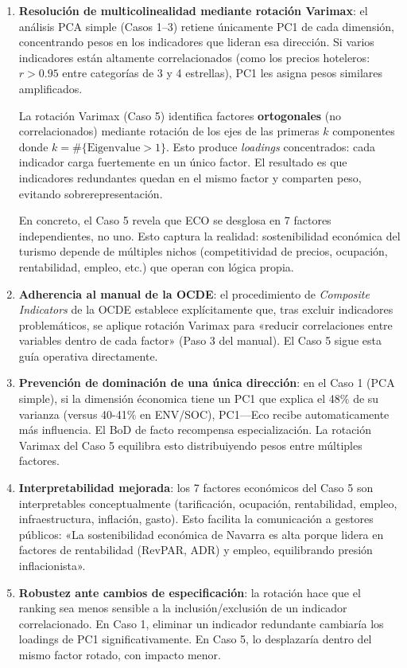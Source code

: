 \begin{enumerate}
    \item \textbf{Resolución de multicolinealidad mediante rotación Varimax}: el análisis PCA simple (Casos 1--3) retiene únicamente PC1 de cada dimensión, concentrando pesos en los indicadores que lideran esa dirección. Si varios indicadores están altamente correlacionados (como los precios hoteleros: $r > 0.95$ entre categorías de 3 y 4 estrellas), PC1 les asigna pesos similares amplificados.
    
    La rotación Varimax (Caso 5) identifica factores \textbf{ortogonales} (no correlacionados) mediante rotación de los ejes de las primeras $k$ componentes donde $k = \#\{\text{Eigenvalue} > 1\}$. Esto produce \textit{loadings} concentrados: cada indicador carga fuertemente en un único factor. El resultado es que indicadores redundantes quedan en el mismo factor y comparten peso, evitando sobrerepresentación.
    
    En concreto, el Caso 5 revela que ECO se desglosa en 7 factores independientes, no uno. Esto captura la realidad: sostenibilidad económica del turismo depende de múltiples nichos (competitividad de precios, ocupación, rentabilidad, empleo, etc.) que operan con lógica propia.
    
    \item \textbf{Adherencia al manual de la OCDE}: el procedimiento de \emph{Composite Indicators} de la OCDE \citep{oecd2008handbook} establece explícitamente que, tras excluir indicadores problemáticos, se aplique rotación Varimax para «reducir correlaciones entre variables dentro de cada factor» (Paso 3 del manual). El Caso 5 sigue esta guía operativa directamente.
    
    \item \textbf{Prevención de dominación de una única dirección}: en el Caso 1 (PCA simple), si la dimensión économica tiene un PC1 que explica el 48\% de su varianza (versus 40-41\% en ENV/SOC), PC1---Eco recibe automaticamente más influencia. El BoD de facto recompensa especialización. La rotación Varimax del Caso 5 equilibra esto distribuiyendo pesos entre múltiples factores.
    
    \item \textbf{Interpretabilidad mejorada}: los 7 factores económicos del Caso 5 son interpretables conceptualmente (tarificación, ocupación, rentabilidad, empleo, infraestructura, inflación, gasto). Esto facilita la comunicación a gestores públicos: «La sostenibilidad económica de Navarra es alta porque lidera en factores de rentabilidad (RevPAR, ADR) y empleo, equilibrando presión inflacionista».
    
    \item \textbf{Robustez ante cambios de especificación}: la rotación hace que el ranking sea menos sensible a la inclusión/exclusión de un indicador correlacionado. En Caso 1, eliminar un indicador redundante cambiaría los loadings de PC1 significativamente. En Caso 5, lo desplazaría dentro del mismo factor rotado, con impacto menor.
\end{enumerate}

